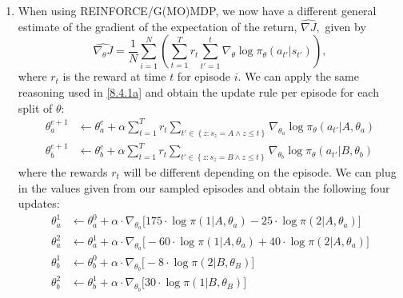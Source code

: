 \documentclass{article}
\begin{document}
\begin{enumerate}
\begin{enumerate}
		      \item When using REINFORCE/G(MO)MDP, we now have a different general estimate of the
		            gradient of the expectation of the return, $\widehat{\nabla J},$ given by
		            \begin{equation}
			            \widehat{\nabla_\theta J} = \frac{1}{N} \sum^N_{i=1}\left(\sum_{t=1}^T r_t
			            \sum_{t'=1}^t\nabla_\theta \log \pi_\theta (a_{t'} | s_{t'})\right),
		            \end{equation}
		            where $r_t$ is the reward at time $t$ for episode $i$. We can apply the same
		            reasoning used in \ref{8.4.1a} and obtain the update rule per episode for each
		            split of $\theta$:
		            \begin{align}
			            \theta^{e+1}_a & \leftarrow \theta^e_a + \alpha \sum_{t=1}^T r_t \sum_{t' \in
			            \left\{z:s_{z} = A \land z \leq t\right\}}  \nabla_{\theta_a} \log \pi_\theta
			            (a_{t'} | A, \theta_a)\label{eq:gpomdp_a_update}                              \\
			            \theta^{e+1}_b & \leftarrow \theta^e_b + \alpha \sum_{t=1}^T r_t \sum_{t' \in
			            \left\{z:s_{z} = B \land z \leq t\right\}}\nabla_{\theta_b} \log \pi_\theta
			            (a_{t'} | B, \theta_b)\label{eq:gpomdp_b_update}
		            \end{align}
		            where the rewards $r_t$ will be different depending on the episode. We can plug in the
		            values given from our sampled episodes and obtain the following four updates:
		            \begin{align}
			            \theta^1_a & \leftarrow \theta^0_a + \alpha \cdot \nabla_{\theta_a} \bigl[175
			            \cdot \log \pi (1 | A, \theta_a) - 25 \cdot \log \pi (2 | A, \theta_a)  \bigr]   \\
			            \theta^2_a & \leftarrow \theta^1_a + \alpha \cdot \nabla_{\theta_a} \bigl[-
			            60 \cdot \log \pi (1 | A, \theta_a) + 40 \cdot \log \pi (2 | A, \theta_a) \bigr] \\
			            \theta^1_b & \leftarrow \theta^0_b + \alpha \cdot \nabla_{\theta_b}
			            \bigl[-8 \cdot \log \pi (2 | B, \theta_B) \bigr]                                 \\
			            \theta^2_b & \leftarrow \theta^1_b + \alpha \cdot \nabla_{\theta_b}
			            \bigl[30 \cdot \log \pi (1 | B, \theta_B) \bigr]
		            \end{align}

\end{enumerate}
\end{enumerate}
\end{document}
